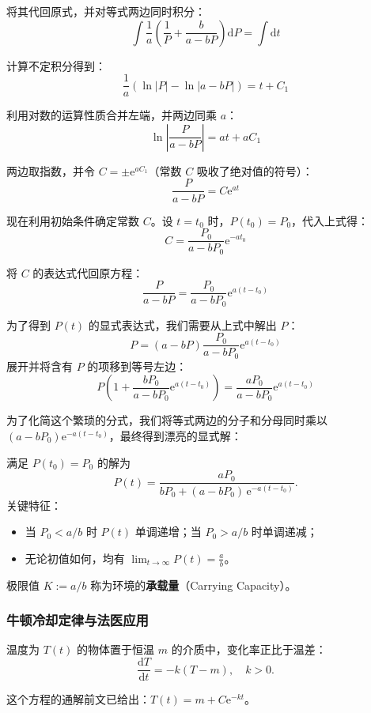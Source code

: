 \documentclass[lang=cn,11pt]{elegantbook}
\begin{document}
将其代回原式，并对等式两边同时积分：
\[
\int \frac{1}{a} \left( \frac{1}{P} + \frac{b}{a-bP} \right) \mathrm{d}P = \int \mathrm{d}t
\]

计算不定积分得到：
\[
\frac{1}{a} \left( \ln|P| - \ln|a-bP| \right) = t + C_1
\]

利用对数的运算性质合并左端，并两边同乘 $a$：
\[
\ln \left| \frac{P}{a-bP} \right| = at + aC_1
\]

两边取指数，并令 $C = \pm \mathrm{e}^{aC_1}$（常数 $C$ 吸收了绝对值的符号）：
\[
\frac{P}{a-bP} = C \mathrm{e}^{at}
\]

现在利用初始条件确定常数 $C$。设 $t = t_0$ 时，$P(t_0) = P_0$，代入上式得：
\[
C = \frac{P_0}{a-bP_0} \mathrm{e}^{-at_0}
\]

将 $C$ 的表达式代回原方程：
\[
\frac{P}{a-bP} = \frac{P_0}{a-bP_0} \mathrm{e}^{a(t-t_0)}
\]

为了得到 $P(t)$ 的显式表达式，我们需要从上式中解出 $P$：
\[
P = (a-bP) \frac{P_0}{a-bP_0} \mathrm{e}^{a(t-t_0)}
\]
展开并将含有 $P$ 的项移到等号左边：
\[
P \left( 1 + \frac{bP_0}{a-bP_0} \mathrm{e}^{a(t-t_0)} \right) = \frac{aP_0}{a-bP_0} \mathrm{e}^{a(t-t_0)}
\]

为了化简这个繁琐的分式，我们将等式两边的分子和分母同时乘以 $(a-bP_0)\mathrm{e}^{-a(t-t_0)}$，最终得到漂亮的显式解：

\begin{property}[逻辑斯蒂模型解及其极限行为]
满足 $P(t_0)=P_0$ 的解为
\[
\boxed{P(t)=\frac{aP_0}{bP_0+(a-bP_0)\,\mathrm{e}^{-a(t-t_0)}}}. \tag{5.8}
\]
关键特征：
\begin{itemize}
  \item 当 $P_0<a/b$ 时 $P(t)$ 单调递增；当 $P_0>a/b$ 时单调递减；
  \item 无论初值如何，均有 $\displaystyle\lim_{t\to\infty}P(t)=\frac{a}{b}$。
\end{itemize}
极限值 $K:=a/b$ 称为环境的\textbf{承载量}（Carrying Capacity）。
\end{property}

\subsubsection*{牛顿冷却定律与法医应用}

\begin{definition}[牛顿冷却定律] \label{def:newton-cooling}
温度为 $T(t)$ 的物体置于恒温 $m$ 的介质中，变化率正比于温差：
\[
\frac{\mathrm{d}T}{\mathrm{d}t}=-k(T-m),\quad k>0. 
\]
\end{definition}
这个方程的通解前文已给出：$T(t)=m+C\mathrm{e}^{-kt}$。
\end{document}
